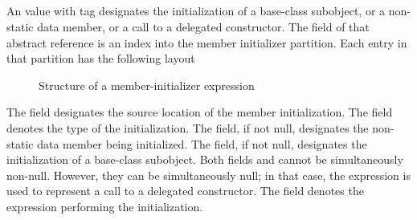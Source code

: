 
\subsection{}
\label{sec:ifc:ExprSort:MemberInitializer}

An  value with tag  designates the initialization of 
a base-class subobject, or a non-static data member, or a call to a delegated constructor.  The 
field of that abstract reference is an index into the member initializer partition.  Each entry in that
partition has the following layout 
%
\begin{figure}[H]
	\centering
	\caption{Structure of a member-initializer expression}
	\label{fig:ifc-member-initializer-expression-structure}
\end{figure}
%
The  field designates the source location of the member initialization.
The  field denotes the type of the initialization.
The  field, if not null, designates the non-static data member being initialized.
The  field, if not null, designates the initialization of a base-class subobject.
Both fields  and  cannot be simultaneously non-null.
However, they can be simultaneously null; in that case, the expression is used
to represent a call to a delegated constructor.
The  field denotes the expression performing the initialization.




\subsection{}
\label{sec:ifc:ExprSort:MemberAccess}

